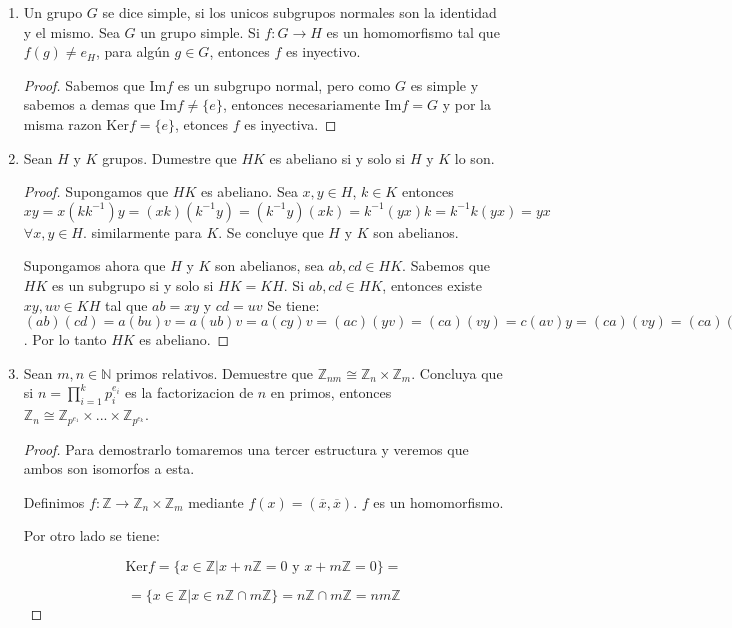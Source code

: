 \documentclass{article}
\theoremstyle{break}
\begin{document}
\begin{enumerate}
		\item Un grupo $G$ se dice simple, si los unicos subgrupos normales son la identidad y el mismo. Sea $G$ un grupo simple. Si $f:G\rightarrow H$ es un homomorfismo tal que $f(g)\not=e_H$, para alg\'un $g\in G$, entonces $f$ es inyectivo.
		
		\begin{proof}
			Sabemos que Im$f$ es un subgrupo normal, pero como $G$ es simple y sabemos a demas que Im$f\not=\{e\}$, entonces necesariamente Im$f=G$ y por la misma razon Ker$f=\{e\}$, etonces $f$ es inyectiva.
		\end{proof}
		
		\item Sean $H$ y $K$ grupos. Dumestre que $HK$ es abeliano si y solo si $H$ y $K$ lo son.
		
		\begin{proof}
		Supongamos que $HK$ es abeliano. Sea $x,y\in H$, $k\in K$ entonces $xy=x(kk^{-1})y=(xk)(k^{-1}y)=(k^{-1}y)(xk)=k^{-1}(yx)k=k^{-1}k(yx)=yx$ $\forall x,y\in H$. similarmente para $K$. Se concluye que $H$ y $K$ son abelianos.
		
		Supongamos ahora que $H$ y $K$ son abelianos, sea $ab,cd\in HK$. Sabemos que $HK$ es un subgrupo si y solo si $HK=KH$. Si $ab,cd\in HK$, entonces existe $xy,uv\in KH$ tal que $ab=xy$ y $cd=uv$ Se tiene: $(ab)(cd)=a(bu)v=a(ub)v=a(cy)v=(ac)(yv)=(ca)(vy)=c(av)y=(ca)(vy)=(ca)(db)=(cd)(ab)$. Por lo tanto $HK$ es abeliano.
		\end{proof}
		
		\item Sean $m,n\in\mathbb{N}$ primos relativos. Demuestre que $\mathbb{Z}_{nm}\cong\mathbb{Z}_n\times\mathbb{Z}_m$. Concluya que si $n=\prod_{i=1}^{k}{p_{i}^{e_i}}$ es la factorizacion de $n$ en primos, entonces $\mathbb{Z}_n\cong\mathbb{Z}_{p^{e_1}}\times...\times\mathbb{Z}_{p^{e_k}}$.
		
		\begin{proof}
			Para demostrarlo tomaremos una tercer estructura y veremos que ambos son isomorfos a esta.
			
			Definimos $f:\mathbb{Z}\rightarrow\mathbb{Z}_n\times\mathbb{Z}_m$ mediante $f(x)=(\overline{x},\overline{x})$. $f$ es un homomorfismo. 
			
			Por otro lado se tiene:
			
			$$
			\mbox{Ker}f=\{x\in\mathbb{Z}|x+n\mathbb{Z}=0\mbox{ y }x+m\mathbb{Z}=0\}=
			$$
			
			$$
			=\{x\in\mathbb{Z}|x\in n\mathbb{Z}\cap m\mathbb{Z}\}=n\mathbb{Z}\cap m\mathbb{Z}=nm\mathbb{Z}
			$$
			

\end{proof}
\end{enumerate}
\end{document}
